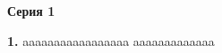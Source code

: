 \documentclass[12pt,a4paper]{article}
\def\q#1.{{\bf #1.}}
\theoremstyle{definition}
\begin{document}
\thispagestyle{firststyle}

\centerline{\bf Серия 1}


\q1. aaaaaaaaaaaaaaaaa
aaaaaaaaaaaaa
\end{document}
